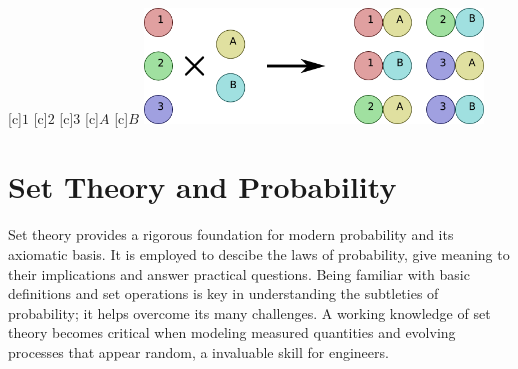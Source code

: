 \begin{center}
\begin{psfrags}
[c]{$1$}
[c]{$2$}
[c]{$3$}
[c]{$A$}
[c]{$B$}
\includegraphics[height=3.06cm]{Figures/1Chapter/cartesianproduct}
\end{psfrags}
\end{center}


\section{Set Theory and Probability}

Set theory provides a rigorous foundation for modern probability and its axiomatic basis.
It is employed to descibe the laws of probability, give meaning to their implications and answer practical questions.
Being familiar with basic definitions and set operations is key in understanding the subtleties of probability; it helps overcome its many challenges.
A working knowledge of set theory becomes critical when modeling measured quantities and evolving processes that appear random, a invaluable skill for engineers.

